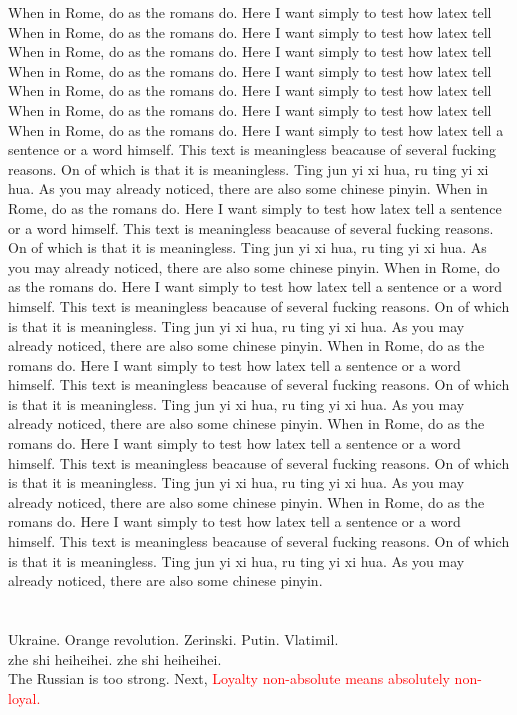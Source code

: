 \documentclass[11pt,oneside,a4paper]{article}
\begin{document}
\begin{multicols}{2}
	When in Rome, do as the romans do. Here I want simply to test how latex tell
	When in Rome, do as the romans do. Here I want simply to test how latex tell
	When in Rome, do as the romans do. Here I want simply to test how latex tell
	When in Rome, do as the romans do. Here I want simply to test how latex tell
	When in Rome, do as the romans do. Here I want simply to test how latex tell
	When in Rome, do as the romans do. Here I want simply to test how latex tell
	When in Rome, do as the romans do. Here I want simply to test how latex tell a sentence or a word himself. This text is meaningless beacause of several fucking reasons. On of which is that it is meaningless. Ting jun yi xi hua, ru ting yi xi hua. As you may already noticed, there are also some chinese pinyin.
	When in Rome, do as the romans do. Here I want simply to test how latex tell a sentence or a word himself. This text is meaningless beacause of several fucking reasons. On of which is that it is meaningless. Ting jun yi xi hua, ru ting yi xi hua. As you may already noticed, there are also some chinese pinyin.
	When in Rome, do as the romans do. Here I want simply to test how latex tell a sentence or a word himself. This text is meaningless beacause of several fucking reasons. On of which is that it is meaningless. Ting jun yi xi hua, ru ting yi xi hua. As you may already noticed, there are also some chinese pinyin.
	When in Rome, do as the romans do. Here I want simply to test how latex tell a sentence or a word himself. This text is meaningless beacause of several fucking reasons. On of which is that it is meaningless. Ting jun yi xi hua, ru ting yi xi hua. As you may already noticed, there are also some chinese pinyin.
	When in Rome, do as the romans do. Here I want simply to test how latex tell a sentence or a word himself. This text is meaningless beacause of several fucking reasons. On of which is that it is meaningless. Ting jun yi xi hua, ru ting yi xi hua. As you may already noticed, there are also some chinese pinyin.
	When in Rome, do as the romans do. Here I want simply to test how latex tell a sentence or a word himself. This text is meaningless beacause of several fucking reasons. On of which is that it is meaningless. Ting jun yi xi hua, ru ting yi xi hua. As you may already noticed, there are also some chinese pinyin.
\end{multicols}
\section{\color{green}{COLOR}}
{\color{orange}Ukraine. Orange revolution. Zerinski. Putin. Vlatimil.}\\
{\color[rgb]{0.5,0.5,1}zhe shi heiheihei.}
{\color[gray]{0.5}zhe shi heiheihei.}\\
The Russian is too strong. Next, 
\textcolor{red}{Loyalty non-absolute means absolutely non-loyal.}\\
\end{document}
